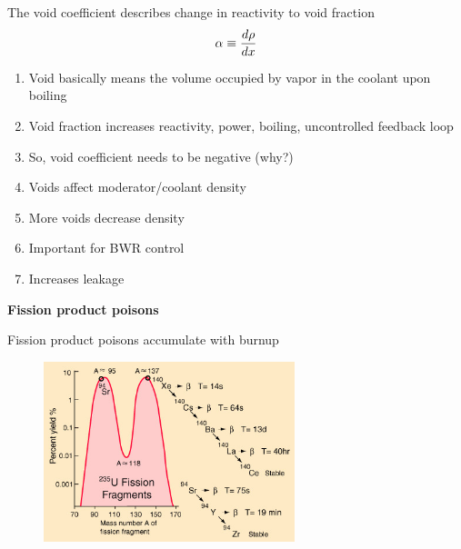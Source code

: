 \documentclass[aspectratio=1610,pdftex,dvipsnames,compress,xcolor={dvipsnames}]{beamer}
\begin{document}
\addtocounter{framenumber}{-1} 
\begin{frame}{The void coefficient describes change in reactivity to void fraction}
    \begin{equation}
        \LARGE
        \alpha \equiv \frac{d\rho}{dx}
    \end{equation}

    \vspace*{\fill}

    \begin{enumerate}[series=outerlist,topsep=0pt,itemsep=15pt,leftmargin=*,label=(\arabic*)]
        \item[]Void basically means the volume occupied by vapor in the coolant upon boiling
        \item[]Void fraction increases reactivity, power, boiling, uncontrolled feedback loop
        \item[]So, void coefficient needs to be negative (why?)
        \item[]Voids affect moderator/coolant density
        \item[]More voids decrease density
        \item[]Important for BWR control
        \item[]Increases leakage
    \end{enumerate}
\end{frame}


\begin{frame}[plain]{}
    \centering\LARGE\textbf{Fission product poisons}
\end{frame}


\addtocounter{framenumber}{-1} 
\begin{frame}{Fission product poisons accumulate with burnup}
    \begin{figure}
        \centering
        \includegraphics[width=0.65\textwidth]{fission.product.yield.jpg}
    \end{figure}
\end{frame}
\end{document}
